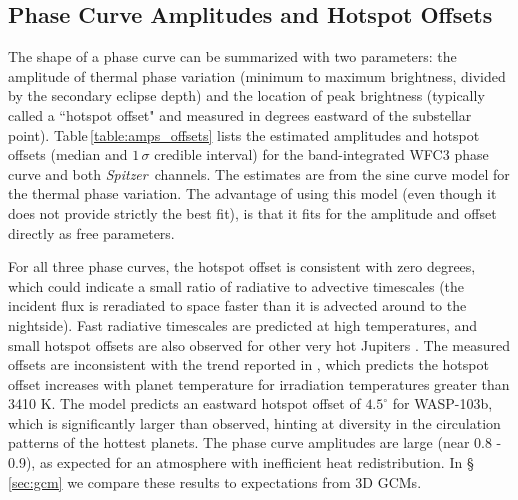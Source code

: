 \documentclass[twocolumn, trackchanges]{aastex61}
\newcommand{\project}[1]{\textsl{#1}}
\newcommand{\Spitzer}{\project{Spitzer}}
\begin{document}
\subsection{Phase Curve Amplitudes and Hotspot Offsets}
The shape of a phase curve can be summarized with two parameters: the amplitude of thermal phase variation (minimum to maximum brightness, divided by the secondary eclipse depth) and the location of peak brightness (typically called a ``hotspot offset" and measured in degrees eastward of the substellar point).  Table\,\ref{table:amps_offsets} lists the estimated amplitudes and hotspot offsets (median and $1\,\sigma$ credible interval) for the band-integrated WFC3 phase curve and both \Spitzer\ channels. The estimates are from the sine curve model for the thermal phase variation. The advantage of using this model (even though it does not provide strictly the best fit), is that it fits for the amplitude and offset directly as free parameters. 


For all three phase curves, the hotspot offset is consistent with zero degrees,
which could indicate a small ratio of radiative to advective timescales (the
incident flux is reradiated to space faster than it is advected around to the
nightside). Fast radiative timescales are predicted at high temperatures, and
small hotspot offsets are also observed for other very hot Jupiters
\citep{perez13, komacek16, komacek17}.  The measured offsets are inconsistent
with the trend reported in \cite{zhang18}, which predicts the hotspot offset
increases with planet temperature for irradiation temperatures greater than 3410
K. The \cite{zhang18} model predicts an eastward hotspot offset of $4.5^\circ$ for WASP-103b, which is significantly larger than observed, hinting at diversity in the circulation patterns of the hottest planets.  The phase curve amplitudes are large (near 0.8 - 0.9), as expected for an atmosphere with inefficient heat redistribution. In \S\,\ref{sec:gcm} we compare these results to expectations from 3D GCMs.

\end{document}
